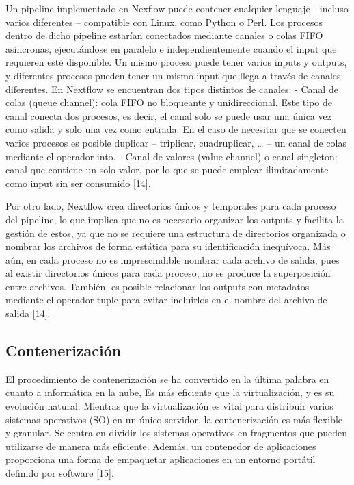 \documentclass[12pt]{article}
\begin{document}
Un pipeline implementado en Nexflow puede contener cualquier 
lenguaje - incluso varios diferentes – compatible con Linux, como Python 
o Perl. Los procesos dentro de dicho pipeline estarían conectados mediante 
canales o colas FIFO asíncronas, ejecutándose en paralelo e independientemente 
cuando el input que requieren esté disponible. Un mismo proceso puede tener varios 
inputs y outputs, y diferentes procesos pueden tener un mismo input que llega a 
través de canales diferentes. En Nextflow se encuentran dos tipos distintos de 
canales: - Canal de colas (queue channel): cola FIFO no bloqueante 
y unidireccional. Este tipo de canal conecta dos procesos, es decir, el 
canal solo se puede usar una única vez como salida y solo una vez como 
entrada. En el caso de necesitar que se conecten varios procesos es posible 
duplicar – triplicar, cuadruplicar, … – un canal de colas mediante el 
operador into. - Canal de valores (value channel) o canal singleton: canal 
que contiene un solo valor, por lo que se puede emplear ilimitadamente 
como input sin ser consumido [14].

Por otro lado, Nextflow crea directorios únicos y 
temporales para cada proceso del pipeline, lo que implica que no es 
necesario organizar los outputs y facilita la gestión de estos, ya que no 
se requiere una estructura de directorios organizada o nombrar los archivos 
de forma estática para su identificación inequívoca. Más aún, en cada proceso 
no es imprescindible nombrar cada archivo de salida, pues al existir directorios 
únicos para cada proceso, no se produce la superposición entre archivos. También, 
es posible relacionar los outputs con metadatos mediante el operador tuple para 
evitar incluirlos en el nombre del archivo de salida [14].

\subsection*{Contenerización}

El procedimiento de contenerización se ha convertido en la última palabra en 
cuanto a informática en la nube,  Es más eficiente que la virtualización, y es 
su evolución natural. Mientras que la virtualización es vital para distribuir 
varios sistemas operativos (SO) en un único servidor, la contenerización es más 
flexible y granular. Se centra en dividir los sistemas operativos en fragmentos 
que pueden utilizarse de manera más eficiente. Además, un contenedor de aplicaciones 
proporciona una forma de empaquetar aplicaciones en un entorno portátil definido por 
software [15]. 
\end{document}
